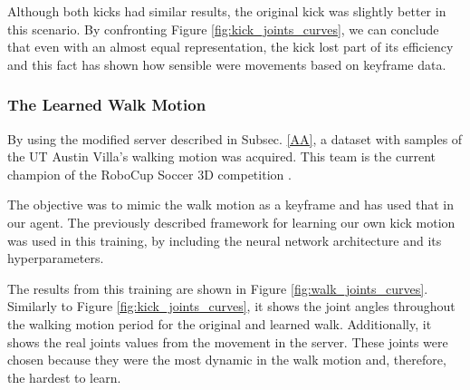 Although both kicks had similar results, the original kick was slightly better in this scenario. By confronting Figure \ref{fig:kick_joints_curves}, we can conclude that even with an almost equal representation, the kick lost part of its efficiency and this fact has shown how sensible were movements based on keyframe data.

\subsubsection{The Learned Walk Motion}
By using the modified server described in Subsec. \ref{AA}, a dataset with samples of the UT Austin Villa's walking motion \cite{macalpine2013} was acquired. This team is the current champion of the RoboCup Soccer 3D competition \cite{macalpine2017}.

The objective was to mimic the walk motion as a keyframe and has used that in our agent. The previously described framework for learning our own kick motion was used in this training, by including the neural network architecture and its hyperparameters.

The results from this training are shown in Figure \ref{fig:walk_joints_curves}. Similarly to Figure \ref{fig:kick_joints_curves}, it shows the joint angles throughout the walking motion period for the original and learned walk. Additionally, it shows the real joints values from the movement in the server. These joints were chosen because they were the most dynamic in the walk motion and, therefore, the hardest to learn.


